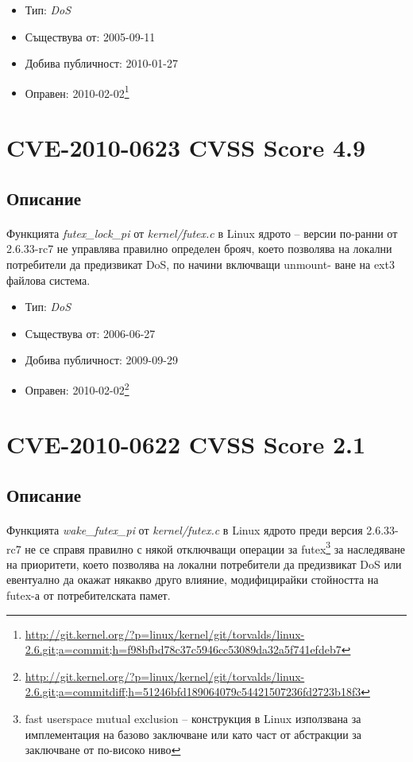 \documentclass[a4paper,12pt,leqno]{article}
\begin{document}
\begin{itemize}
    \item Тип: \textit{DoS}
    \item Съществува от: 2005-09-11
  	\item Добива публичност: 2010-01-27
    \item Оправен: 2010-02-02\footnote{\url{http://git.kernel.org/?p=linux/kernel/git/torvalds/linux-2.6.git;a=commit;h=f98bfbd78c37c5946cc53089da32a5f741efdeb7}}
\end{itemize}


\section{CVE-2010-0623 CVSS Score 4.9}
\subsection{Описание}
\paragraph{}
Функцията \textit{futex\_lock\_pi} от \textit{kernel/futex.c} в Linux ядрото – версии по-ранни от 
2.6.33-rc7 не управлява правилно определен брояч, което позволява на 
локални потребители да предизвикат DoS, по начини включващи unmount-
ване на ext3 файлова система.

\begin{itemize}
    \item Тип: \textit{DoS}
    \item Съществува от: 2006-06-27
  	\item Добива публичност: 2009-09-29
    \item Оправен: 2010-02-02\footnote{\url{http://git.kernel.org/?p=linux/kernel/git/torvalds/linux-2.6.git;a=commitdiff;h=51246bfd189064079c54421507236fd2723b18f3}}
\end{itemize}

\section{CVE-2010-0622 CVSS Score 2.1}
\subsection{Описание}
\paragraph{}
Функцията \textit{wake\_futex\_pi} от \textit{kernel/futex.c} в Linux ядрото преди версия 2.6.33-
rc7 не се справя правилно с някой отключващи операции за futex\footnote{fast userspace mutual exclusion – конструкция в Linux използвана за имплементация на базово 
заключване или като част от абстракции за заключване от по-високо ниво}
 за наследяване на приоритети, което позволява на локални потребители да 
предизвикат DoS или евентуално да окажат някакво друго влияние, 
модифицирайки стойността на futex-а от потребителската памет.
\end{document}
